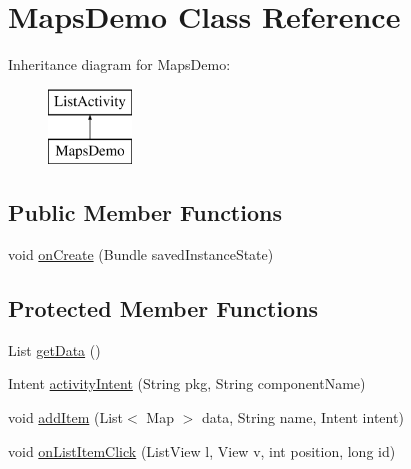 \hypertarget{classcom_1_1example_1_1android_1_1apis_1_1_maps_demo}{\section{Maps\-Demo Class Reference}
\label{classcom_1_1example_1_1android_1_1apis_1_1_maps_demo}
}
Inheritance diagram for Maps\-Demo\-:\begin{figure}[H]
\begin{center}
\leavevmode
\includegraphics[height=2.000000cm]{classcom_1_1example_1_1android_1_1apis_1_1_maps_demo}
\end{center}
\end{figure}
\subsection*{Public Member Functions}
\begin{DoxyCompactItemize}
\item 
void \hyperlink{classcom_1_1example_1_1android_1_1apis_1_1_maps_demo_a85e87cb5ced88dff7c8173ecc4f636d1}{on\-Create} (Bundle saved\-Instance\-State)
\end{DoxyCompactItemize}
\subsection*{Protected Member Functions}
\begin{DoxyCompactItemize}
\item 
List \hyperlink{classcom_1_1example_1_1android_1_1apis_1_1_maps_demo_ae3d31cc60738b9d617b66263d649d979}{get\-Data} ()
\item 
Intent \hyperlink{classcom_1_1example_1_1android_1_1apis_1_1_maps_demo_a82e10f82f4f86004fab135af13df87da}{activity\-Intent} (String pkg, String component\-Name)
\item 
void \hyperlink{classcom_1_1example_1_1android_1_1apis_1_1_maps_demo_aec1fb45112c6734dd3d866525c117201}{add\-Item} (List$<$ Map $>$ data, String name, Intent intent)
\item 
void \hyperlink{classcom_1_1example_1_1android_1_1apis_1_1_maps_demo_a4aac7a5362b301019e466032250c646e}{on\-List\-Item\-Click} (List\-View l, View v, int position, long id)
\end{DoxyCompactItemize}


